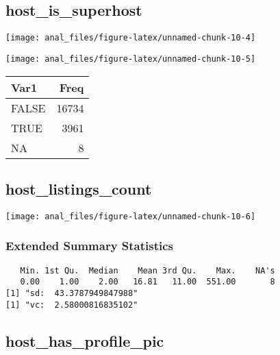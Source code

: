 \hypertarget{host_is_superhost}{%
\subsection{host\_is\_superhost}\label{host_is_superhost}}

\begin{center}\texttt{[image: anal\_files/figure-latex/unnamed-chunk-10-4]} \end{center}

\begin{center}\texttt{[image: anal\_files/figure-latex/unnamed-chunk-10-5]} \end{center}

\begin{table}[H]
\centering
\begin{tabular}[t]{lr}
\toprule
Var1 & Freq\\
\midrule
FALSE & 16734\\
TRUE & 3961\\
NA & 8\\
\bottomrule
\end{tabular}
\end{table}
\pagebreak

\hypertarget{host_listings_count}{%
\subsection{host\_listings\_count}\label{host_listings_count}}

\begin{center}\texttt{[image: anal\_files/figure-latex/unnamed-chunk-10-6]} \end{center}

\hypertarget{extended-summary-statistics}{%
\subsubsection{Extended Summary
Statistics}\label{extended-summary-statistics}}

\begin{verbatim}   Min. 1st Qu.  Median    Mean 3rd Qu.    Max.    NA's 
   0.00    1.00    2.00   16.81   11.00  551.00       8 
[1] "sd:  43.3787949847988"
[1] "vc:  2.58000816835102"
\end{verbatim}

\pagebreak

\hypertarget{host_has_profile_pic}{%
\subsection{host\_has\_profile\_pic}\label{host_has_profile_pic}}

